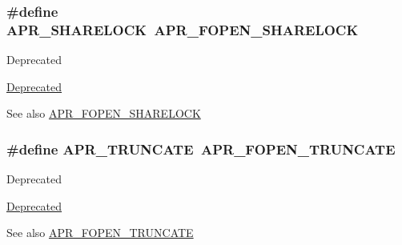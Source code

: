 \subsubsection[{\texorpdfstring{A\+P\+R\+\_\+\+S\+H\+A\+R\+E\+L\+O\+CK}{APR_SHARELOCK}}]{\setlength{\rightskip}{0pt plus 5cm}\#define A\+P\+R\+\_\+\+S\+H\+A\+R\+E\+L\+O\+CK~{\bf A\+P\+R\+\_\+\+F\+O\+P\+E\+N\+\_\+\+S\+H\+A\+R\+E\+L\+O\+CK}}\hypertarget{group__apr__file__open__flags_ga41277154f4f754a22287ed90e9466811}{}\label{group__apr__file__open__flags_ga41277154f4f754a22287ed90e9466811}
\begin{DoxyRefDesc}{Deprecated}
\item[\hyperlink{deprecated__deprecated000027}{Deprecated}]\end{DoxyRefDesc}
\begin{DoxySeeAlso}{See also}
\hyperlink{group__apr__file__open__flags_ga426f6e2a8457ab410d99248269059a18}{A\+P\+R\+\_\+\+F\+O\+P\+E\+N\+\_\+\+S\+H\+A\+R\+E\+L\+O\+CK} 
\end{DoxySeeAlso}
\subsubsection[{\texorpdfstring{A\+P\+R\+\_\+\+T\+R\+U\+N\+C\+A\+TE}{APR_TRUNCATE}}]{\setlength{\rightskip}{0pt plus 5cm}\#define A\+P\+R\+\_\+\+T\+R\+U\+N\+C\+A\+TE~{\bf A\+P\+R\+\_\+\+F\+O\+P\+E\+N\+\_\+\+T\+R\+U\+N\+C\+A\+TE}}\hypertarget{group__apr__file__open__flags_gaa8898fdebd69d3a64286731b713a6dc9}{}\label{group__apr__file__open__flags_gaa8898fdebd69d3a64286731b713a6dc9}
\begin{DoxyRefDesc}{Deprecated}
\item[\hyperlink{deprecated__deprecated000021}{Deprecated}]\end{DoxyRefDesc}
\begin{DoxySeeAlso}{See also}
\hyperlink{group__apr__file__open__flags_ga09b05a5bd5db534b93794f7657bcb146}{A\+P\+R\+\_\+\+F\+O\+P\+E\+N\+\_\+\+T\+R\+U\+N\+C\+A\+TE} 
\end{DoxySeeAlso}
